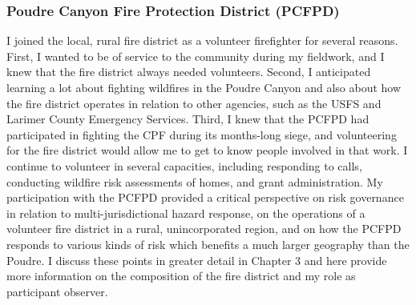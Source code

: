 \documentclass[
]{article}
\begin{document}
\subsubsection{Poudre Canyon Fire Protection District (PCFPD)}\label{poudre-canyon-fire-protection-district-pcfpd}

I joined the local, rural fire district as a volunteer firefighter for several reasons. First, I wanted to be of service to the community during my fieldwork, and I knew that the fire district always needed volunteers. Second, I anticipated learning a lot about fighting wildfires in the Poudre Canyon and also about how the fire district operates in relation to other agencies, such as the USFS and Larimer County Emergency Services. Third, I knew that the PCFPD had participated in fighting the CPF during its months-long siege, and volunteering for the fire district would allow me to get to know people involved in that work. I continue to volunteer in several capacities, including responding to calls, conducting wildfire risk assessments of homes, and grant administration. My participation with the PCFPD provided a critical perspective on risk governance in relation to multi-jurisdictional hazard response, on the operations of a volunteer fire district in a rural, unincorporated region, and on how the PCFPD responds to various kinds of risk which benefits a much larger geography than the Poudre. I discuss these points in greater detail in Chapter 3 and here provide more information on the composition of the fire district and my role as participant observer.
\end{document}
